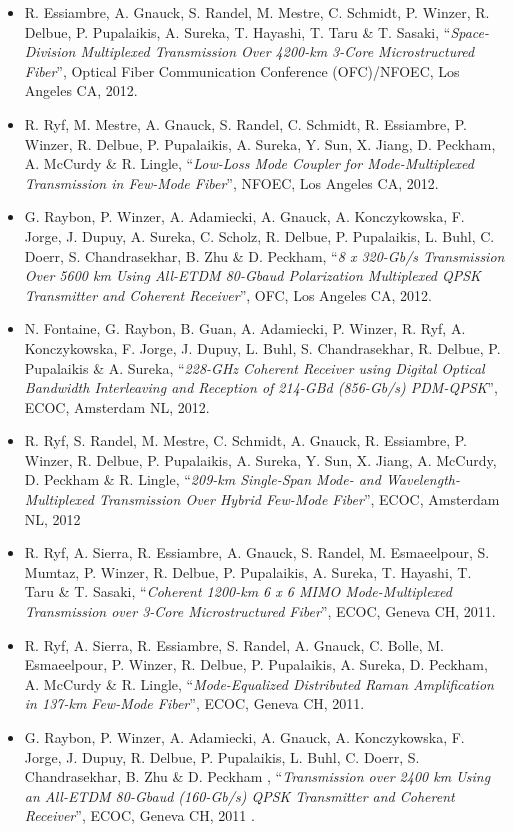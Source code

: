 \documentclass[10pt,letterpaper]{extarticle}
\newenvironment{indentsection}[1]%
{\begin{list}{}%
	{\setlength{\leftmargin}{#1}}%
	\item[]%
}
{\end{list}}
\begin{document}
\begin{indentsection}{-1em}
\begin{itemize}
\item R. Essiambre, A. Gnauck, S. Randel, M. Mestre, C. Schmidt, P. Winzer, R. Delbue, P. Pupalaikis, A. Sureka, T. Hayashi, T. Taru \& T. Sasaki, “\emph{Space-Division Multiplexed Transmission Over 4200-km 3-Core Microstructured Fiber}”, Optical Fiber Communication Conference (OFC)/NFOEC, Los Angeles CA, 2012.
\item R. Ryf, M. Mestre, A. Gnauck, S. Randel, C. Schmidt, R. Essiambre, P. Winzer, R. Delbue, P. Pupalaikis, A. Sureka, Y. Sun, X. Jiang, D. Peckham, A. McCurdy \& R. Lingle, “\emph{Low-Loss Mode Coupler for Mode-Multiplexed Transmission in Few-Mode Fiber}”, NFOEC, Los Angeles CA, 2012.
\item G. Raybon, P. Winzer, A. Adamiecki, A. Gnauck, A. Konczykowska, F. Jorge, J. Dupuy, A. Sureka, C. Scholz, R. Delbue, P. Pupalaikis, L. Buhl, C. Doerr, S. Chandrasekhar, B. Zhu \& D. Peckham, “\emph{8 x 320-Gb/s Transmission Over 5600 km Using All-ETDM 80-Gbaud Polarization Multiplexed QPSK Transmitter and Coherent Receiver}”, OFC, Los Angeles CA, 2012.
\item N. Fontaine, G. Raybon, B. Guan, A. Adamiecki, P. Winzer, R. Ryf, A. Konczykowska, F. Jorge, J. Dupuy, L. Buhl, S. Chandrasekhar, R. Delbue, P. Pupalaikis \& A. Sureka, “\emph{228-GHz Coherent Receiver using Digital Optical Bandwidth Interleaving and Reception of 214-GBd (856-Gb/s) PDM-QPSK}”, ECOC, Amsterdam NL, 2012.
\item R. Ryf, S. Randel, M. Mestre, C. Schmidt, A. Gnauck, R. Essiambre, P. Winzer, R. Delbue, P. Pupalaikis, A. Sureka, Y. Sun, X. Jiang, A. McCurdy, D. Peckham \& R. Lingle, “\emph{209-km Single-Span Mode- and Wavelength-Multiplexed Transmission Over Hybrid Few-Mode Fiber}”, ECOC, Amsterdam NL, 2012
\item R. Ryf, A. Sierra, R. Essiambre, A. Gnauck, S. Randel, M. Esmaeelpour, S. Mumtaz, P. Winzer, R. Delbue, P. Pupalaikis, A. Sureka, T. Hayashi, T. Taru \& T. Sasaki, “\emph{Coherent 1200-km 6 x 6 MIMO Mode-Multiplexed Transmission over 3-Core Microstructured Fiber}”, ECOC, Geneva CH, 2011.
\item R. Ryf, A. Sierra, R. Essiambre, S. Randel, A. Gnauck, C. Bolle, M. Esmaeelpour, P. Winzer, R. Delbue, P. Pupalaikis, A. Sureka, D. Peckham, A. McCurdy \& R. Lingle, “\emph{Mode-Equalized Distributed Raman Amplification in 137-km Few-Mode Fiber}”, ECOC, Geneva CH, 2011. 
\item G. Raybon, P. Winzer, A. Adamiecki, A. Gnauck, A. Konczykowska, F. Jorge, J. Dupuy, R. Delbue, P. Pupalaikis, L. Buhl, C. Doerr, S. Chandrasekhar, B. Zhu \& D. Peckham , “\emph{Transmission over 2400 km Using an All-ETDM 80-Gbaud (160-Gb/s) QPSK Transmitter and Coherent Receiver}”, ECOC, Geneva CH, 2011 .

\end{itemize}
\end{indentsection}
\end{document}
